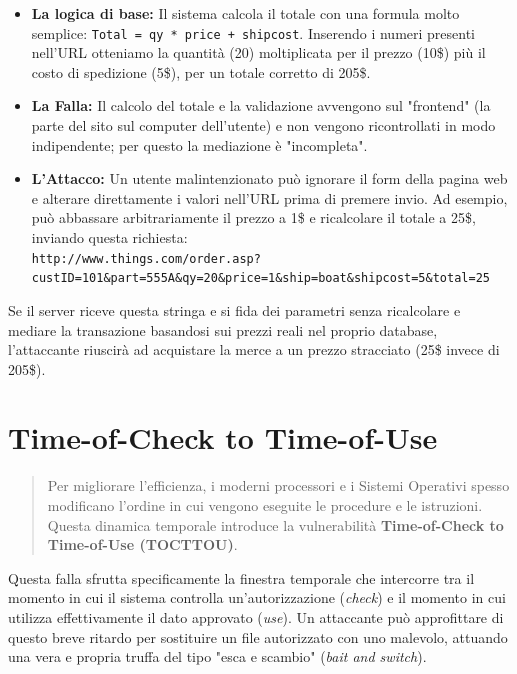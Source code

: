 \documentclass{article}
\begin{document}
\begin{itemize}
    \item \textbf{La logica di base:} Il sistema calcola il totale con una formula molto semplice: \texttt{Total = qy * price + shipcost}. Inserendo i numeri presenti nell'URL otteniamo la quantità (20) moltiplicata per il prezzo (10\$) più il costo di spedizione (5\$), per un totale corretto di 205\$.
    \item \textbf{La Falla:} Il calcolo del totale e la validazione avvengono sul "frontend" (la parte del sito sul computer dell'utente) e non vengono ricontrollati in modo indipendente; per questo la mediazione è "incompleta".
    \item \textbf{L'Attacco:} Un utente malintenzionato può ignorare il form della pagina web e alterare direttamente i valori nell'URL prima di premere invio. Ad esempio, può abbassare arbitrariamente il prezzo a 1\$ e ricalcolare il totale a 25\$, inviando questa richiesta: \\
    \texttt{http://www.things.com/order.asp?custID=101\&part=555A\&qy=20\&price=1\&ship=boat\&shipcost=5\&total=25}
\end{itemize}

Se il server riceve questa stringa e si fida dei parametri senza ricalcolare e mediare la transazione basandosi sui prezzi reali nel proprio database, l'attaccante riuscirà ad acquistare la merce a un prezzo stracciato (25\$ invece di 205\$).

\vspace{0.8cm}

\section*{Time-of-Check to Time-of-Use}

\begin{quote}
    Per migliorare l'efficienza, i moderni processori e i Sistemi Operativi spesso modificano l'ordine in cui vengono eseguite le procedure e le istruzioni. Questa dinamica temporale introduce la vulnerabilità \textbf{Time-of-Check to Time-of-Use (TOCTTOU)}.
\end{quote}

Questa falla sfrutta specificamente la finestra temporale che intercorre tra il momento in cui il sistema controlla un'autorizzazione (\textit{check}) e il momento in cui utilizza effettivamente il dato approvato (\textit{use}). Un attaccante può approfittare di questo breve ritardo per sostituire un file autorizzato con uno malevolo, attuando una vera e propria truffa del tipo "esca e scambio" (\textit{bait and switch}).
\end{document}
